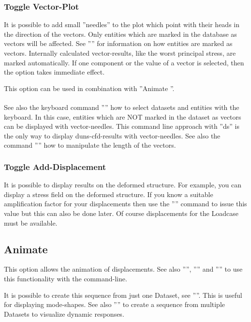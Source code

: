 \documentclass{article}
\begin{document}
\subsubsection{\label{Toggle Vector-Plot}Toggle Vector-Plot}
It is possible to add small ''needles'' to the plot which point with their heads in the direction of the vectors. Only entities which are marked in the database as vectors will be affected. See '''' for information on how entities are marked as vectors. Internally calculated vector-results, like the worst principal stress, are marked automatically. If one component or the value of a vector is selected, then the option takes immediate effect.

This option can be used in combination with ''Animate ''.\\\\See also the keyboard command '''' how to select datasets and entities with the keyboard. In this case, entities which are NOT marked in the dataset as vectors can be displayed with vector-needles. This command line approach with ''ds'' is the only way to display duns-cfd-results with vector-needles. See also the command '''' how to manipulate the length of the vectors.  

\subsubsection{\label{Toggle Add-Displacement}Toggle Add-Displacement}
It is possible to display results on the deformed structure. For example, you can display a stress field on the deformed structure. If you know a suitable amplification factor for your displacements then use the '''' command to issue this value but this can also be done later. Of course displacements for the Loadcase must be available.


\subsection{\label{animation}Animate}
This option allows the animation of displacements. See also '''', '''' and '''' to use this functionality with the command-line.

It is possible to create this sequence from just one Dataset, see ''''. This is useful for displaying mode-shapes. See also '''' to create a sequence from multiple Datasets to visualize dynamic responses.
   
\end{document}
